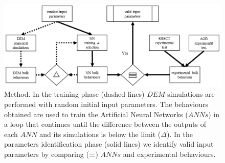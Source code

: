 \begin{figure}[!htb] 
\centering 
\includegraphics[width=.96\textwidth]{images/019methodology} 
\caption[Method]{Method. In the training phase (dashed lines)
$DEM$ simulations are performed
with random initial input parameters.
The behaviours obtained are used to train the
Artificial Neural Networks ($ANNs$) in a loop that continues until the
difference between the outputs of each $ANN$ and its simulations is below the
limit ($\Delta$).
In the parameters identification phase (solid
lines) we identify valid input parameters by comparing (\textbf{=}) $ANNs$ and
experimental behaviours.}
\label{fig:019methodology} 
\end{figure}